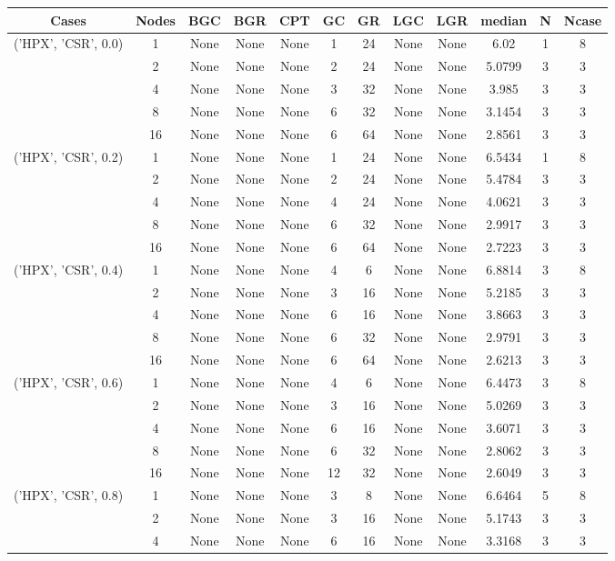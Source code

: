 \begin{tabular}{cccccccccccc}
\hline
Cases & Nodes& BGC& BGR& CPT& GC& GR& LGC& LGR& median & N & Ncase \\
\hline
\multirow{5}{*}{('HPX', 'CSR', 0.0)}& 1& None& None& None& 1& 24& None& None& 6.02& 1& 8\\
& 2& None& None& None& 2& 24& None& None& 5.0799& 3& 3\\
& 4& None& None& None& 3& 32& None& None& 3.985& 3& 3\\
& 8& None& None& None& 6& 32& None& None& 3.1454& 3& 3\\
& 16& None& None& None& 6& 64& None& None& 2.8561& 3& 3\\
\hline
\multirow{5}{*}{('HPX', 'CSR', 0.2)}& 1& None& None& None& 1& 24& None& None& 6.5434& 1& 8\\
& 2& None& None& None& 2& 24& None& None& 5.4784& 3& 3\\
& 4& None& None& None& 4& 24& None& None& 4.0621& 3& 3\\
& 8& None& None& None& 6& 32& None& None& 2.9917& 3& 3\\
& 16& None& None& None& 6& 64& None& None& 2.7223& 3& 3\\
\hline
\multirow{5}{*}{('HPX', 'CSR', 0.4)}& 1& None& None& None& 4& 6& None& None& 6.8814& 3& 8\\
& 2& None& None& None& 3& 16& None& None& 5.2185& 3& 3\\
& 4& None& None& None& 6& 16& None& None& 3.8663& 3& 3\\
& 8& None& None& None& 6& 32& None& None& 2.9791& 3& 3\\
& 16& None& None& None& 6& 64& None& None& 2.6213& 3& 3\\
\hline
\multirow{5}{*}{('HPX', 'CSR', 0.6)}& 1& None& None& None& 4& 6& None& None& 6.4473& 3& 8\\
& 2& None& None& None& 3& 16& None& None& 5.0269& 3& 3\\
& 4& None& None& None& 6& 16& None& None& 3.6071& 3& 3\\
& 8& None& None& None& 6& 32& None& None& 2.8062& 3& 3\\
& 16& None& None& None& 12& 32& None& None& 2.6049& 3& 3\\
\hline
\multirow{5}{*}{('HPX', 'CSR', 0.8)}& 1& None& None& None& 3& 8& None& None& 6.6464& 5& 8\\
& 2& None& None& None& 3& 16& None& None& 5.1743& 3& 3\\
& 4& None& None& None& 6& 16& None& None& 3.3168& 3& 3\\

\end{tabular}
